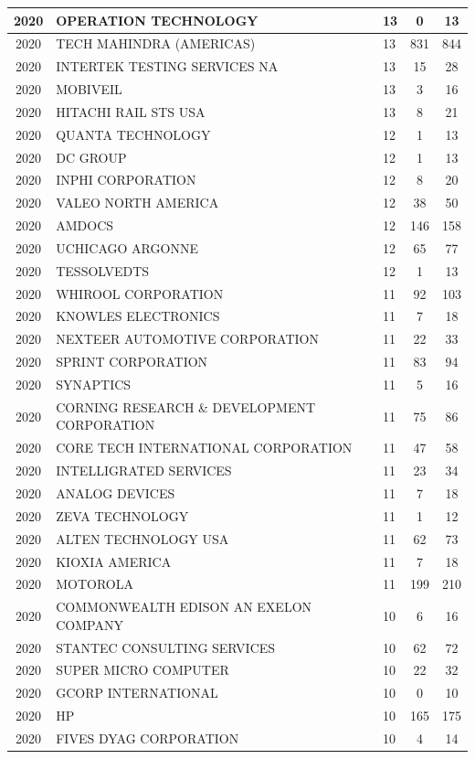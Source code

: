\documentclass{article}%
\begin{document}
\begin{longtable}{c|p{20em}|p{5em}|c|c}
\hline%
2020&OPERATION TECHNOLOGY&13&0&13\\%
\hline%
2020&TECH MAHINDRA (AMERICAS)&13&831&844\\%
\hline%
2020&INTERTEK TESTING SERVICES NA&13&15&28\\%
\hline%
2020&MOBIVEIL&13&3&16\\%
\hline%
2020&HITACHI RAIL STS USA&13&8&21\\%
\hline%
2020&QUANTA TECHNOLOGY&12&1&13\\%
\hline%
2020&DC GROUP&12&1&13\\%
\hline%
2020&INPHI CORPORATION&12&8&20\\%
\hline%
2020&VALEO NORTH AMERICA&12&38&50\\%
\hline%
2020&AMDOCS&12&146&158\\%
\hline%
2020&UCHICAGO ARGONNE&12&65&77\\%
\hline%
2020&TESSOLVEDTS&12&1&13\\%
\hline%
2020&WHIROOL CORPORATION&11&92&103\\%
\hline%
2020&KNOWLES ELECTRONICS&11&7&18\\%
\hline%
2020&NEXTEER AUTOMOTIVE CORPORATION&11&22&33\\%
\hline%
2020&SPRINT CORPORATION&11&83&94\\%
\hline%
2020&SYNAPTICS&11&5&16\\%
\hline%
2020&CORNING RESEARCH \& DEVELOPMENT CORPORATION&11&75&86\\%
\hline%
2020&CORE TECH INTERNATIONAL CORPORATION&11&47&58\\%
\hline%
2020&INTELLIGRATED SERVICES&11&23&34\\%
\hline%
2020&ANALOG DEVICES&11&7&18\\%
\hline%
2020&ZEVA TECHNOLOGY&11&1&12\\%
\hline%
2020&ALTEN TECHNOLOGY USA&11&62&73\\%
\hline%
2020&KIOXIA AMERICA&11&7&18\\%
\hline%
2020&MOTOROLA&11&199&210\\%
\hline%
2020&COMMONWEALTH EDISON AN EXELON COMPANY&10&6&16\\%
\hline%
2020&STANTEC CONSULTING SERVICES&10&62&72\\%
\hline%
2020&SUPER MICRO COMPUTER&10&22&32\\%
\hline%
2020&GCORP INTERNATIONAL&10&0&10\\%
\hline%
2020&HP&10&165&175\\%
\hline%
2020&FIVES DYAG CORPORATION&10&4&14\\%

\end{longtable}
\end{document}
